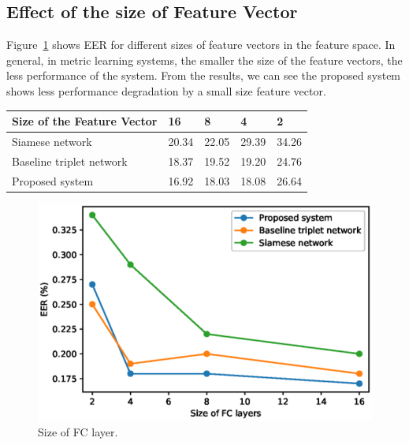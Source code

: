 \subsection{Effect of the size of Feature Vector}
Figure~\ref{fclayer} shows EER for different sizes of feature vectors in the feature space. In general, in metric learning systems, the smaller the size of the feature vectors, the less performance of the system.
From the results, we can see the proposed system shows less performance degradation by a small size feature vector.
\begin{table}[]
    \centering
    \begin{tabular}{|l|l|l|l|l|}
    \hline
    Size of the Feature Vector & 16    & 8     & 4     & 2     \\ \hline
    Siamese network            & 20.34 & 22.05 & 29.39 & 34.26 \\ \hline
    Baseline triplet network   & 18.37 & 19.52 & 19.20 & 24.76 \\ \hline
    Proposed system            & 16.92 & 18.03 & 18.08 & 26.64 \\ \hline
    \end{tabular}
\end{table}
\begin{figure}[!ht]
    \includegraphics[width=\textwidth]{fclayer_v1.eps}
    \caption{Size of FC layer.} \label{fclayer}
\end{figure}
